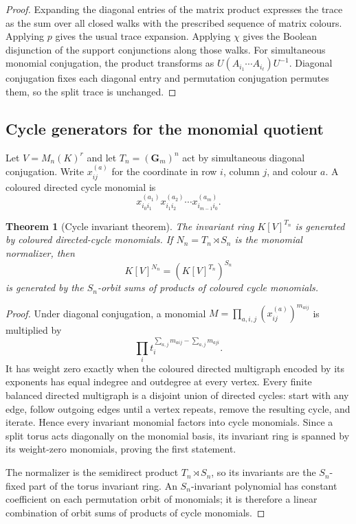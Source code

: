 \documentclass[11pt]{amsart}
\numberwithin{equation}{section}
\newtheorem{theorem}{Theorem}[section]
\theoremstyle{definition}
\newcommand{\Gm}{\mathbf G_m}
\begin{document}
\begin{proof}
Expanding the diagonal entries of the matrix product expresses the trace as
the sum over all closed walks with the prescribed sequence of matrix
colours.  Applying $p$ gives the usual trace expansion.  Applying $\chi$
gives the Boolean disjunction of the support conjunctions along those
walks.  For simultaneous monomial conjugation, the product transforms as
$U(A_{i_1}\cdots A_{i_\ell})U^{-1}$.  Diagonal conjugation fixes each
diagonal entry and permutation conjugation permutes them, so the split
trace is unchanged.
\end{proof}

\subsection{Cycle generators for the monomial quotient}

Let $V=M_n(K)^r$ and let $T_n=(\Gm)^n$ act by simultaneous diagonal
conjugation.  Write $x_{ij}^{(a)}$ for the coordinate in row $i$, column
$j$, and colour $a$.  A coloured directed cycle monomial is
\[
x_{i_0i_1}^{(a_1)}x_{i_1i_2}^{(a_2)}\cdots
x_{i_{m-1}i_0}^{(a_m)}.
\]

\begin{theorem}[Cycle invariant theorem]
\label{thm:cycle-invariant-ring}
The invariant ring $K[V]^{T_n}$ is generated by coloured directed-cycle
monomials.  If $N_n=T_n\rtimes S_n$ is the monomial normalizer, then
\[
K[V]^{N_n}=(K[V]^{T_n})^{S_n}
\]
is generated by the $S_n$-orbit sums of products of coloured cycle
monomials.
\end{theorem}

\begin{proof}
Under diagonal conjugation, a monomial
$M=\prod_{a,i,j}(x_{ij}^{(a)})^{m_{aij}}$ is multiplied by
\[
\prod_i t_i^{\sum_{a,j}m_{aij}-\sum_{a,j}m_{aji}}.
\]
It has weight zero exactly when the coloured directed multigraph encoded by
its exponents has equal indegree and outdegree at every vertex.  Every finite
balanced directed multigraph is a disjoint union of directed cycles: start
with any edge, follow outgoing edges until a vertex repeats, remove the
resulting cycle, and iterate.  Hence every invariant monomial factors into
cycle monomials.  Since a split torus acts diagonally on the monomial basis,
its invariant ring is spanned by its weight-zero monomials, proving the first
statement.

The normalizer is the semidirect product $T_n\rtimes S_n$, so its invariants
are the $S_n$-fixed part of the torus invariant ring.  An $S_n$-invariant
polynomial has constant coefficient on each permutation orbit of monomials;
it is therefore a linear combination of orbit sums of products of cycle
monomials.
\end{proof}
\end{document}
